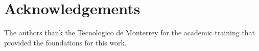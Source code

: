 \documentclass[preprint,12pt]{elsarticle}
\begin{document}
\section*{Acknowledgements}
The authors thank the Tecnologico de Monterrey for the academic training that provided the foundations for this work.

\def\bibfont{\scriptsize\linespread{0.92}\selectfont}\setlength{\bibsep}{0pt}
{


}
\end{document}
